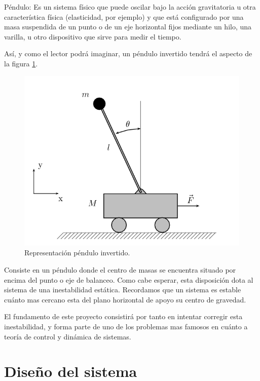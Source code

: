 \begin{definicion}Péndulo: Es un sistema físico que puede oscilar bajo la acción gravitatoria u otra característica física (elasticidad, por ejemplo) y que está configurado por una masa suspendida de un punto o de un eje horizontal fijos mediante un hilo, una varilla, u otro dispositivo que sirve para medir el tiempo. \newline
\end{definicion}
Así, y como el lector podrá imaginar, un péndulo invertido tendrá el aspecto de la figura \ref{fig:pendulo}. 

\begin{figure}[H]
	\center
	\includegraphics[trim = 0mm 0mm 0mm 0mm, clip,scale=1.6]{imagenes/Balancing_robot/pendulo}
	\caption{Representación péndulo invertido.}
	\label{fig:pendulo}
\end{figure}

Consiste en un péndulo donde el centro de masas se encuentra situado por encima del punto o eje de balanceo. Como cabe esperar, esta disposición dota al sistema de una inestabilidad estática. Recordamos que un sistema es estable cuánto mas cercano esta del plano horizontal de apoyo su centro de gravedad. \newline

El fundamento de este proyecto consistirá por tanto en intentar corregir esta inestabilidad, y forma parte de uno de los problemas mas famosos en cuánto a teoría de control y dinámica de sistemas. 

\newpage
\section{Diseño del sistema}\label{sec:Diseno}

